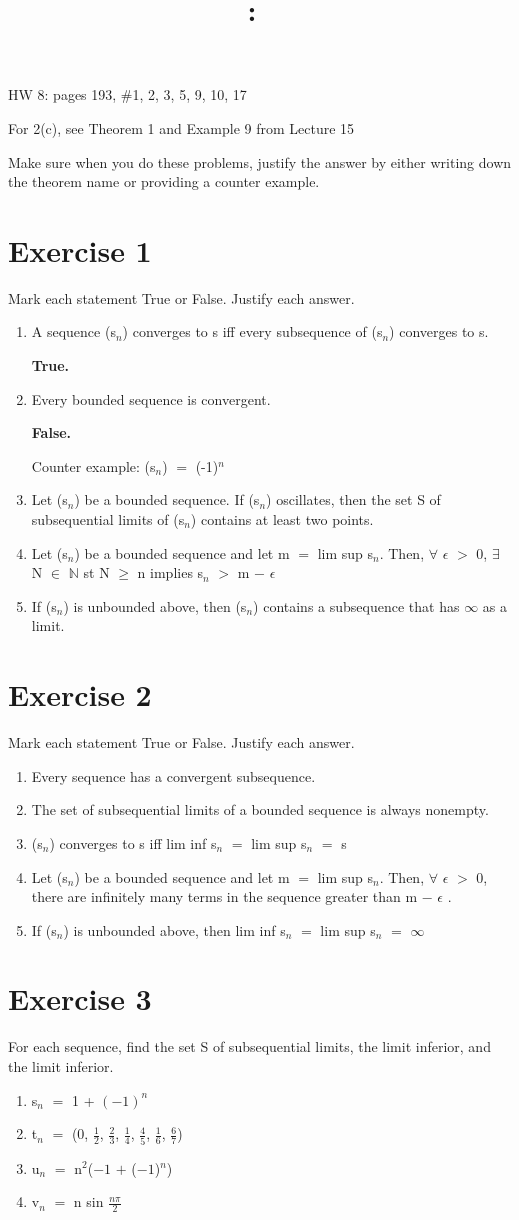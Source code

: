 \documentclass{article}
\title{
    \vspace{2in}
    \textmd{\textbf{\hmwkClass:\ \hmwkTitle}}\\
    \normalsize\vspace{0.1in}\small\vspace{0.1in}\large{\textit{\hmwkClassInstructor}}
    \vspace{3in}
}
\author{\hmwkAuthorName}
\date{}
\newcommand{\mt}[1]{\ensuremath{#1}}
\newcommand\bsc[2][\DefaultOpt]{%
  \def\DefaultOpt{#2}%
  \section[#1]{#2}%
}
\newcommand{\balist}{\begin{enumerate}[label=\alph*.]}
\newcommand{\elist}{\end{enumerate}}
\newcommand{\bn}{\mt{\mathbb{N}} }       %
\newcommand{\ep}{\mt{\epsilon} }         %
\newcommand{\fa}{\mt{\forall} }          %
\newcommand{\mem}{\mt{\in} }
\newcommand{\exs}{\mt{\exists} }
\newcommand{\prn}[1]{(#1)}
\newcommand{\ps}{\mt{+} }
\newcommand{\ms}{\mt{-} }
\newcommand{\gr}{\mt{>} }
\newcommand{\gre}{\mt{\geq} }
\newcommand{\eql}{\mt{=} }
\newcommand{\uw}[2]{#1\mt{_{#2}}}
\newcommand{\uf}[2]{#1\mt{^{#2}}}
\newcommand{\frc}[2]{\mt{\frac{#1}{#2}}}
\newcommand{\infy}{\mt{\infty} }
\begin{document}
HW 8: pages 193, \#1, 2, 3, 5, 9, 10, 17

For 2(c), see Theorem 1 and Example 9 from Lecture 15

Make sure when you do these problems, justify the answer by either writing down the theorem name or providing a counter example.

\bsc{Exercise 1}{

Mark each statement True or False. Justify each answer.

\balist
\item A sequence \prn{\uw{s}{n}} converges to s iff every subsequence of (\uw{s}{n}) converges to s.
	
	\textbf{True.}
	
	
\item Every bounded sequence is convergent.
	
	\textbf{False.}
	
	Counter example: \prn{\uw{s}{n}} \eql \uf{(-1)}{n}
\item Let (\uw{s}{n}) be a bounded sequence. If \prn{\uw{s}{n}} oscillates, then the set S of subsequential limits of \prn{\uw{s}{n}} contains at least two points.
\item Let \prn{\uw{s}{n}} be a bounded sequence and let m \eql lim sup \uw{s}{n}. Then, \fa \ep \gr 0, \exs N \mem \bn st N \gre n implies \uw{s}{n} \gr m \ms \ep
\item If \prn{\uw{s}{n}} is unbounded above, then \prn{\uw{s}{n}} contains a subsequence that has \infy as a limit.
\elist

}

\bsc{Exercise 2}{

Mark each statement True or False. Justify each answer.

\balist
\item Every sequence has a convergent subsequence.
\item The set of subsequential limits of a bounded sequence is always nonempty.
\item \prn{\uw{s}{n}} converges to s iff lim inf \uw{s}{n} \eql lim sup \uw{s}{n} \eql s
\item Let (\uw{s}{n}) be a bounded sequence and let m \eql lim sup \uw{s}{n}. Then, \fa \ep \gr 0, there are infinitely many terms in the sequence greater than m \ms \ep.
\item If \prn{\uw{s}{n}} is unbounded above, then lim inf \uw{s}{n} \eql lim sup \uw{s}{n} \eql \infy 
\elist 

}

\bsc{Exercise 3}{

For each sequence, find the set S of subsequential limits, the limit inferior, and the limit inferior.

\balist
\item \uw{s}{n} \eql 1 + $(-1)^n$
\item \uw{t}{n} \eql (0, \frc{1}{2}, \frc{2}{3}, \frc{1}{4}, \frc{4}{5}, \frc{1}{6}, \frc{6}{7})
\item \uw{u}{n} \eql \uf{n}{2}($-1$ \ps ($-1$)$^n$)
\item \uw{v}{n} \eql n sin \frc{n\pi}{2}
\elist

}
\end{document}
